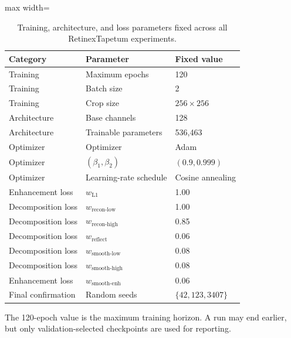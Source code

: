 \begin{table}[t]
  \centering
  \caption{Training, architecture, and loss parameters fixed across all
  RetinexTapetum experiments.}
  \label{tab:retinextapetum-fixed-hyperparameters}
  \small
  \begin{threeparttable}
    \begin{adjustbox}{max width=\columnwidth}
      \begin{tabular}{lll}
        \toprule
        Category & Parameter & Fixed value \\
        \midrule
        Training & Maximum epochs & 120 \\
        Training & Batch size & 2 \\
        Training & Crop size & $256\!\times\!256$ \\
        Architecture & Base channels & 128 \\
        Architecture & Trainable parameters & 536,463 \\
        Optimizer & Optimizer & Adam \\
        Optimizer & $(\beta_1,\beta_2)$ & $(0.9,0.999)$ \\
        Optimizer & Learning-rate schedule & Cosine annealing \\
        Enhancement loss & $w_{\mathrm{L1}}$ & 1.00 \\
        Decomposition loss & $w_{\mathrm{recon\text{-}low}}$ & 1.00 \\
        Decomposition loss & $w_{\mathrm{recon\text{-}high}}$ & 0.85 \\
        Decomposition loss & $w_{\mathrm{reflect}}$ & 0.06 \\
        Decomposition loss & $w_{\mathrm{smooth\text{-}low}}$ & 0.08 \\
        Decomposition loss & $w_{\mathrm{smooth\text{-}high}}$ & 0.08 \\
        Enhancement loss & $w_{\mathrm{smooth\text{-}enh}}$ & 0.06 \\
        Final confirmation & Random seeds & $\{42,123,3407\}$ \\
        \bottomrule
      \end{tabular}
    \end{adjustbox}
    \begin{tablenotes}[flushleft]
      \footnotesize
      \item The 120-epoch value is the maximum training horizon. A run may end
      earlier, but only validation-selected checkpoints are used for reporting.
    \end{tablenotes}
  \end{threeparttable}
\end{table}

